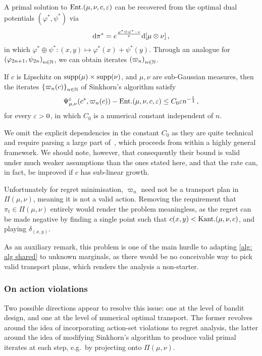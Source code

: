 A primal solution to $\text{Ent.}(\mu,\nu,c,\varepsilon)$ can be recovered from the optimal dual potentials $(\varphi^*,\psi^*)$ via
\[ 
    \mathrm{d}\pi^*=e^{\frac{\varphi^*\oplus\psi^*-c}{\varepsilon}}\mathrm{d}[\mu\otimes\nu]\,,
\]  
in which $\varphi^*\oplus\psi^*: (x,y)\mapsto \varphi^*(x)+\psi^*(y)$. Through an analogue for ${(\varphi_{2n+1},\psi_{2n})}_{n\in\mathbb{N}}$, we can obtain iterates ${(\varpi_n)}_{n\in\mathbb{N}}$.

\begin{lemma}\label{lemma: bound on inf memory sinkhorn}
    If $c$ is Lipschitz on $\text{supp}(\mu)\times\text{supp}(\nu)$, and $\mu,\nu$ are sub-Gaussian measures, then the iterates ${\{\varpi_n(c)\}}_{n\in\mathbb{N}}$ of Sinkhorn's algorithm satisfy
    \[
        \Psi_{\mu,\nu}^\varepsilon(c^*,\varpi_n(c)) - \text{Ent.}(\mu,\nu,c,\varepsilon)\le C_0\varepsilon n^{-\frac14}\,,
    \]
    for every $\varepsilon>0$, in which $C_0$ is a numerical constant independent of $n$.
\end{lemma}
We omit the explicit dependencies in the constant $C_0$ as they are quite technical and require parsing a large part of~\cite{eckstein_quantitative_2022}, which proceeds from within a highly general framework. We should note, however, that consequently their bound is valid under much weaker assumptions than the ones stated here, and that the rate can, in fact, be improved if $c$ has sub-linear growth.


Unfortunately for regret minimisation, $\varpi_n$ need not be a transport plan in $\Pi(\mu,\nu)$, meaning it is not a valid action. Removing the requirement that $\pi_t\in\Pi(\mu,\nu)$ entirely would render the problem meaningless, as the regret can be made negative by finding a single point such that $c(x,y)<\text{Kant.}(\mu,\nu,c)$, and playing $\delta_{(x,y)}$. 

As an auxiliary remark, this problem is one of the main hurdle to adapting \cref{alg: alg shared} to unknown marginals, as there would be no conceivable way to pick valid transport plans, which renders the analysis a non-starter.


\subsubsection{On action violations}


Two possible directions appear to resolve this issue: one at the level of bandit design, and one at the level of numerical optimal transport. The former revolves around the idea of incorporating action-set violations to regret analysis, the latter around the idea of modifying Sinkhorn's algorithm to produce valid primal iterates at each step, e.g.\ by projecting onto $\Pi(\mu,\nu)$.

